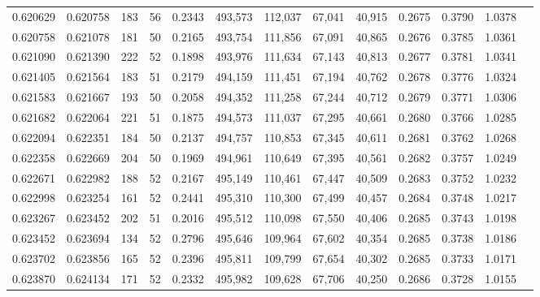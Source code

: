 \begin{tabular}{rrrrrrrrrrrrr}
0.620629 & 0.620758 &    183 &    56 &                                     0.2343 & 493,573 & 112,037 &  67,041 &  40,915 & 0.2675 & 0.3790 & 1.0378 \\
0.620758 & 0.621078 &    181 &    50 &                                     0.2165 & 493,754 & 111,856 &  67,091 &  40,865 & 0.2676 & 0.3785 & 1.0361 \\
0.621090 & 0.621390 &    222 &    52 &                                     0.1898 & 493,976 & 111,634 &  67,143 &  40,813 & 0.2677 & 0.3781 & 1.0341 \\
0.621405 & 0.621564 &    183 &    51 &                                     0.2179 & 494,159 & 111,451 &  67,194 &  40,762 & 0.2678 & 0.3776 & 1.0324 \\
0.621583 & 0.621667 &    193 &    50 &                                     0.2058 & 494,352 & 111,258 &  67,244 &  40,712 & 0.2679 & 0.3771 & 1.0306 \\
0.621682 & 0.622064 &    221 &    51 &                                     0.1875 & 494,573 & 111,037 &  67,295 &  40,661 & 0.2680 & 0.3766 & 1.0285 \\
0.622094 & 0.622351 &    184 &    50 &                                     0.2137 & 494,757 & 110,853 &  67,345 &  40,611 & 0.2681 & 0.3762 & 1.0268 \\
0.622358 & 0.622669 &    204 &    50 &                                     0.1969 & 494,961 & 110,649 &  67,395 &  40,561 & 0.2682 & 0.3757 & 1.0249 \\
0.622671 & 0.622982 &    188 &    52 &                                     0.2167 & 495,149 & 110,461 &  67,447 &  40,509 & 0.2683 & 0.3752 & 1.0232 \\
0.622998 & 0.623254 &    161 &    52 &                                     0.2441 & 495,310 & 110,300 &  67,499 &  40,457 & 0.2684 & 0.3748 & 1.0217 \\
0.623267 & 0.623452 &    202 &    51 &                                     0.2016 & 495,512 & 110,098 &  67,550 &  40,406 & 0.2685 & 0.3743 & 1.0198 \\
0.623452 & 0.623694 &    134 &    52 &                                     0.2796 & 495,646 & 109,964 &  67,602 &  40,354 & 0.2685 & 0.3738 & 1.0186 \\
0.623702 & 0.623856 &    165 &    52 &                                     0.2396 & 495,811 & 109,799 &  67,654 &  40,302 & 0.2685 & 0.3733 & 1.0171 \\
0.623870 & 0.624134 &    171 &    52 &                                     0.2332 & 495,982 & 109,628 &  67,706 &  40,250 & 0.2686 & 0.3728 & 1.0155 \\

\end{tabular}
